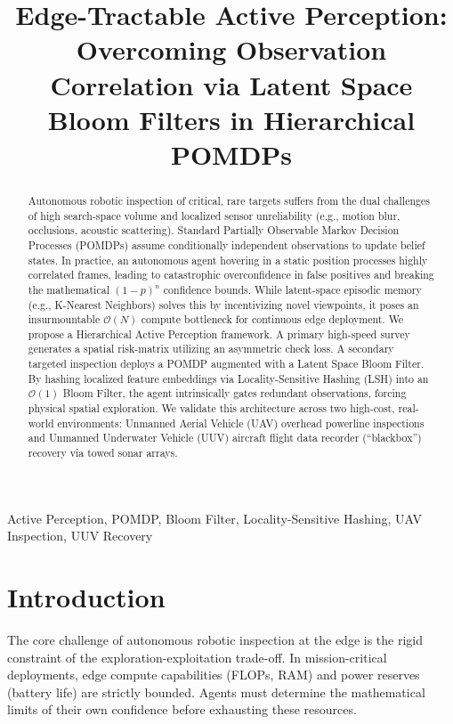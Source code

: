 \documentclass[conference]{IEEEtran}
\begin{document}
\title{Edge-Tractable Active Perception: Overcoming Observation Correlation via Latent Space Bloom Filters in Hierarchical POMDPs\\
}

\author{
}

\maketitle

\begin{abstract}
Autonomous robotic inspection of critical, rare targets suffers from the dual challenges of high search-space volume and localized sensor unreliability (e.g., motion blur, occlusions, acoustic scattering). Standard Partially Observable Markov Decision Processes (POMDPs) assume conditionally independent observations to update belief states. In practice, an autonomous agent hovering in a static position processes highly correlated frames, leading to catastrophic overconfidence in false positives and breaking the mathematical $(1-p)^n$ confidence bounds. While latent-space episodic memory (e.g., K-Nearest Neighbors) solves this by incentivizing novel viewpoints, it poses an insurmountable $\mathcal{O}(N)$ compute bottleneck for continuous edge deployment. We propose a Hierarchical Active Perception framework. A primary high-speed survey generates a spatial risk-matrix utilizing an asymmetric check loss. A secondary targeted inspection deploys a POMDP augmented with a Latent Space Bloom Filter. By hashing localized feature embeddings via Locality-Sensitive Hashing (LSH) into an $\mathcal{O}(1)$ Bloom Filter, the agent intrinsically gates redundant observations, forcing physical spatial exploration. We validate this architecture across two high-cost, real-world environments: Unmanned Aerial Vehicle (UAV) overhead powerline inspections and Unmanned Underwater Vehicle (UUV) aircraft flight data recorder (``blackbox'') recovery via towed sonar arrays.
\end{abstract}

\begin{IEEEkeywords}
Active Perception, POMDP, Bloom Filter, Locality-Sensitive Hashing, UAV Inspection, UUV Recovery
\end{IEEEkeywords}

\section{Introduction}
The core challenge of autonomous robotic inspection at the edge is the rigid constraint of the exploration-exploitation trade-off. In mission-critical deployments, edge compute capabilities (FLOPs, RAM) and power reserves (battery life) are strictly bounded. Agents must determine the mathematical limits of their own confidence before exhausting these resources. 
\end{document}
